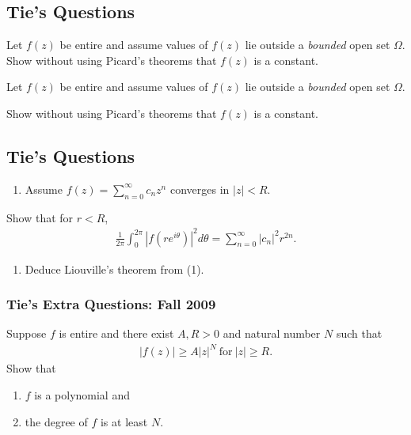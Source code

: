 \hypertarget{ties-questions}{%
\subsection{Tie's Questions}\label{ties-questions}}

Let \(f(z)\) be entire and assume values of \(f(z)\) lie outside a
\emph{bounded} open set \(\Omega\). Show without using Picard's theorems
that \(f(z)\) is a constant.

Let \(f(z)\) be entire and assume values of \(f(z)\) lie outside a
\emph{bounded} open set \(\Omega\).

Show without using Picard's theorems that \(f(z)\) is a constant.

\hypertarget{ties-questions-1}{%
\subsection{Tie's Questions}\label{ties-questions-1}}

\begin{enumerate}
\def\labelenumi{\arabic{enumi}.}
\tightlist
\item
  Assume \(\displaystyle f(z) = \sum_{n=0}^\infty c_n z^n\) converges in
  \(|z| < R\).
\end{enumerate}

Show that for \(r <R\),
\begin{align*}
\frac{1}{2 \pi} \int_0^{2 \pi} |f(r e^{i \theta})|^2 d \theta = \sum_{n=0}^\infty |c_n|^2 r^{2n}
.\end{align*}

\begin{enumerate}
\def\labelenumi{\arabic{enumi}.}
\setcounter{enumi}{1}
\tightlist
\item
  Deduce Liouville's theorem from (1).
\end{enumerate}

\hypertarget{ties-extra-questions-fall-2009-2}{%
\subsubsection{Tie's Extra Questions: Fall
2009}\label{ties-extra-questions-fall-2009-2}}

Suppose \(f\) is entire and there exist \(A, R >0\) and natural number
\(N\) such that
\begin{align*}|f(z)| \geq A |z|^N\ \text{for}\ |z| \geq R.\end{align*}
Show that

\begin{enumerate}
\def\labelenumi{\arabic{enumi}.}
\tightlist
\item
  \(f\) is a polynomial and
\item
  the degree of \(f\) is at least \(N\).
\end{enumerate}

